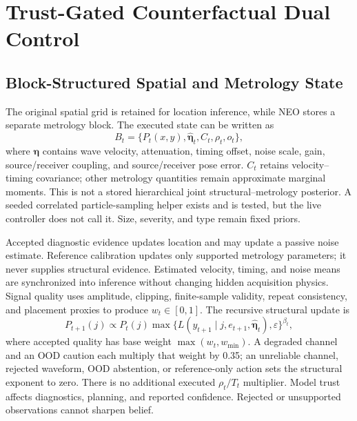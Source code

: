 \documentclass[conference]{IEEEtran}
\newcommand{\vect}[1]{\boldsymbol{#1}}
\newcommand{\eps}{\varepsilon}
\begin{document}
\section{Trust-Gated Counterfactual Dual Control}
\subsection{Block-Structured Spatial and Metrology State}
The original spatial grid is retained for location inference, while NEO stores a separate metrology block. The executed state can be written as
\begin{equation}
 B_t=\{P_t(x,y),\hat{\vect\eta}_t,C_t,\rho_t,o_t\},
 \label{eq:joint-state}
\end{equation}
where $\vect\eta$ contains wave velocity, attenuation, timing offset, noise scale, gain, source/receiver coupling, and source/receiver pose error. $C_t$ retains velocity--timing covariance; other metrology quantities remain approximate marginal moments. This is not a stored hierarchical joint structural--metrology posterior. A seeded correlated particle-sampling helper exists and is tested, but the live controller does not call it. Size, severity, and type remain fixed priors.

Accepted diagnostic evidence updates location and may update a passive noise estimate. Reference calibration updates only supported metrology parameters; it never supplies structural evidence. Estimated velocity, timing, and noise means are synchronized into inference without changing hidden acquisition physics. Signal quality uses amplitude, clipping, finite-sample validity, repeat consistency, and placement proxies to produce $w_t\in[0,1]$. The recursive structural update is
\begin{equation}
 P_{t+1}(j)\propto P_t(j)
 \max\{L(y_{t+1}\mid j,e_{t+1},\hat{\vect\eta}_t),\eps\}^{\beta_t},
 \label{eq:tempered-update}
\end{equation}
where accepted quality has base weight $\max(w_t,w_{\min})$. A degraded channel and an OOD caution each multiply that weight by 0.35; an unreliable channel, rejected waveform, OOD abstention, or reference-only action sets the structural exponent to zero. There is no additional executed $\rho_t/T_t$ multiplier. Model trust affects diagnostics, planning, and reported confidence. Rejected or unsupported observations cannot sharpen belief.
\end{document}
